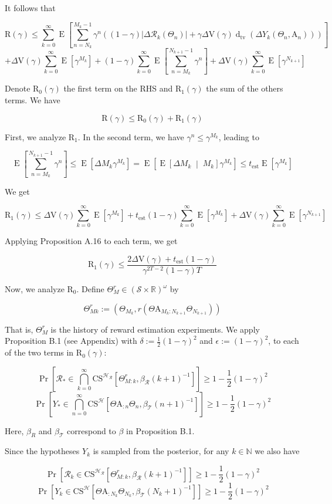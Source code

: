 \documentclass[a4paper]{article}
\newcommand{\AP}[1]{\left(#1\right)}
\newcommand{\AB}[1]{\left[#1\right]}
\newcommand{\ABM}[2]{\left[#1\;\middle\vert\;#2\right]}
\newcommand{\Abs}[1]{\left\vert #1 \right\vert}
\newcommand{\Pb}[1]{\operatorname{Pr}\AB{#1}}
\newcommand{\E}[1]{\operatorname{E}\AB{#1}}
\newcommand{\CE}[3]{\underset{#1}{\operatorname{E}}\ABM{#2}{#3}}
\newcommand{\Dtva}[1]{\operatorname{d}_{\text{tv}}\AP{#1}}
\newcommand{\Nats}{\mathbb{N}}
\newcommand{\Reals}{\mathbb{R}}
\newcommand{\St}{\mathcal{S}}
\newcommand{\R}{\mathcal{R}}
\newcommand{\T}{\mathcal{T}}
\newcommand{\Hy}{\mathcal{H}}
\newcommand{\Est}{\mathrm{est}}
\newcommand{\V}{\mathrm{V}}
\newcommand{\Reg}{\mathrm{R}}
\newcommand{\SHy}{Y}
\newcommand{\AT}{\mathrm{A}}
\newcommand{\ET}{N}
\newcommand{\IT}{M}
\newcommand{\CS}{\mathrm{CS}}
\begin{document}
It follows that

$$\Reg(\gamma)\leq\sum_{k=0}^\infty\E{\sum_{n=\ET_k}^{\IT_k-1}\gamma^{n}\AP{(1-\gamma)\Abs{\Delta\R_k\AP{\Theta_n}}+\gamma\Delta\V(\gamma)\Dtva{\Delta\SHy_k\AP{\Theta_n,\AT_n}}}}$$
$$+\Delta\V(\gamma)\sum_{k=0}^\infty\E{{\gamma^{\IT_k}}}+(1-\gamma)\sum_{k=0}^\infty\E{\sum_{n=\IT_k}^{\ET_{k+1}-1}\gamma^n}+\Delta\V(\gamma)\sum_{k=0}^\infty\E{\gamma^{\ET_{k+1}}}$$

Denote $\Reg_{0}(\gamma)$ the first term on the RHS and $\Reg_{1}(\gamma)$ the sum of the others terms. We have

$$\Reg(\gamma)\leq\Reg_0(\gamma)+\Reg_1(\gamma)$$

First, we analyze $\Reg_1$. In the second term, we have $\gamma^n\leq\gamma^{M_k}$, leading to

$$\E{\sum_{n=\IT_k}^{\ET_{k+1}-1}\gamma^n}\leq\E{\Delta M_k\gamma^{M_k}}=\E{\CE{}{\Delta M_k}{M_k}\gamma^{M_k}}\leq t_\Est\E{\gamma^{M_k}}$$

We get

$$\Reg_1(\gamma)\leq\Delta\V(\gamma)\sum_{k=0}^\infty\E{{\gamma^{\IT_k}}}+t_\Est(1-\gamma)\sum_{k=0}^\infty\E{\gamma^{M_k}}+\Delta\V(\gamma)\sum_{k=0}^\infty\E{\gamma^{\ET_{k+1}}}$$

Applying Proposition A.16 to each term, we get

$$\Reg_1(\gamma)\leq\frac{2\Delta\V(\gamma)+t_\Est(1-\gamma)}{\gamma^{2T-2}(1-\gamma)T}$$

Now, we analyze $\Reg_0$. Define $\Theta_M^r\in\AP{\St\times\Reals}^\omega$ by

$$\Theta_{Mk}^r:=\AP{\Theta_{M_k},r\AP{\Theta\AT_{M_k:N_{k+1}}\Theta_{N_{k+1}}}}$$

That is, $\Theta_M^r$ is the history of reward estimation experiments. We apply Proposition B.1 (see Appendix) with $\delta:=\frac{1}{2}(1-\gamma)^2$ and $\epsilon:=(1-\gamma)^2$, to each of the two terms in $\Reg_0(\gamma)$:

$$\Pb{\R_*\in\bigcap_{k=0}^\infty\CS^{\Hy_\R}\AB{\Theta_{M:k}^{r},\beta_\R(k+1)^{-1}}} \geq 1-\frac{1}{2}(1-\gamma)^2$$
$$\Pb{\SHy_*\in\bigcap_{n=0}^\infty\CS^{\Hy}\AB{\Theta\AT_{:n}\Theta_n,\beta_\T(n+1)^{-1}}} \geq 1-\frac{1}{2}(1-\gamma)^2$$

Here, $\beta_R$ and $\beta_\T$ correspond to $\beta$ in Proposition B.1.

Since the hypotheses $\SHy_k$ is sampled from the posterior, for any $k\in\Nats$ we also have

$$\Pb{\R_k\in\CS^{\Hy_\R}\AB{\Theta_{M:k}^{r},\beta_\R(k+1)^{-1}}} \geq 1-\frac{1}{2}(1-\gamma)^2$$
$$\Pb{\SHy_{k}\in\CS^\Hy\AB{\Theta\AT_{:N_k}\Theta_{N_k},\beta_\T\AP{N_k+1}^{-1}}} \geq 1-\frac{1}{2}(1-\gamma)^2$$
\end{document}
